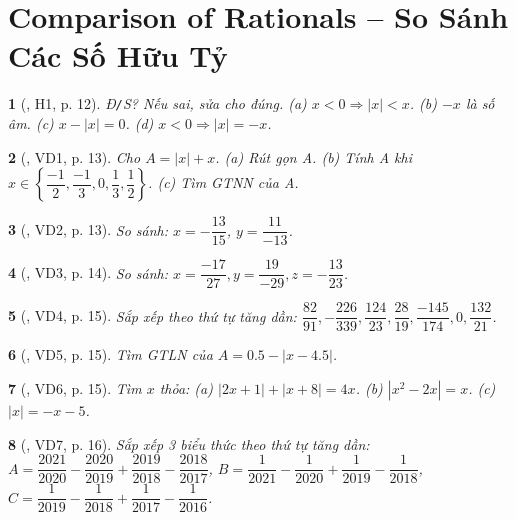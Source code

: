 \documentclass{article}
\newtheorem{baitoan}{}
\begin{document}

\section{Comparison of Rationals -- So Sánh Các Số Hữu Tỷ}

\begin{baitoan}[\cite{Binh_boi_duong_Toan_7_tap_1}, H1, p. 12]
	{\rm Đ{\tt/}S?} Nếu sai, sửa cho đúng. (a) $x < 0\Rightarrow|x| < x$. (b) $-x$ là số âm. (c) $x - |x| = 0$. (d) $x < 0\Rightarrow|x| = -x$.
\end{baitoan}

\begin{baitoan}[\cite{Binh_boi_duong_Toan_7_tap_1}, VD1, p. 13]
	Cho $A = |x| + x$. (a) Rút gọn A. (b) Tính A khi $x\in\left\{\dfrac{-1}{2},\dfrac{-1}{3},0,\dfrac{1}{3},\dfrac{1}{2}\right\}$. (c) Tìm {\rm GTNN} của A.
\end{baitoan}

\begin{baitoan}[\cite{Binh_boi_duong_Toan_7_tap_1}, VD2, p. 13]
	So sánh: $x = -\dfrac{13}{15}$, $y = \dfrac{11}{-13}$.
\end{baitoan}

\begin{baitoan}[\cite{Binh_boi_duong_Toan_7_tap_1}, VD3, p. 14]
	So sánh: $x = \dfrac{-17}{27},y = \dfrac{19}{-29},z = -\dfrac{13}{23}$.
\end{baitoan}

\begin{baitoan}[\cite{Binh_boi_duong_Toan_7_tap_1}, VD4, p. 15]
	Sắp xếp theo thứ tự tăng dần: $\dfrac{82}{91},-\dfrac{226}{339},\dfrac{124}{23},\dfrac{28}{19},\dfrac{-145}{174},0,\dfrac{132}{21}$.
\end{baitoan}

\begin{baitoan}[\cite{Binh_boi_duong_Toan_7_tap_1}, VD5, p. 15]
	Tìm {\rm GTLN} của $A = 0.5 - |x - 4.5|$.
\end{baitoan}

\begin{baitoan}[\cite{Binh_boi_duong_Toan_7_tap_1}, VD6, p. 15]
	Tìm $x$ thỏa: (a) $|2x + 1| + |x + 8| = 4x$. (b) $|x^2 - 2x| = x$. (c) $|x| = -x - 5$.
\end{baitoan}

\begin{baitoan}[\cite{Binh_boi_duong_Toan_7_tap_1}, VD7, p. 16]
	Sắp xếp 3 biểu thức theo thứ tự tăng dần: $A = \dfrac{2021}{2020} - \dfrac{2020}{2019} + \dfrac{2019}{2018} - \dfrac{2018}{2017}$, $B = \dfrac{1}{2021} - \dfrac{1}{2020} + \dfrac{1}{2019} - \dfrac{1}{2018}$, $C = \dfrac{1}{2019} - \dfrac{1}{2018} + \dfrac{1}{2017} - \dfrac{1}{2016}$.
\end{baitoan}
\end{document}
